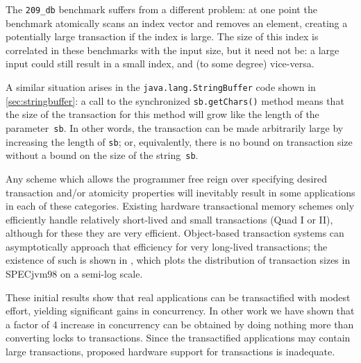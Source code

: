 The \texttt{209\_db} benchmark suffers from a different problem: at one
point the benchmark atomically scans an index vector and removes an
element, creating a potentially large transaction if the index is
large.  The size of this index is correlated in these benchmarks with
the input size, but it need not be: a large input could still result
in a small index, and (to some degree) vice-versa.

A similar situation arises in the {\tt java.lang.StringBuffer} code
shown in \ref{sec:stringbuffer}:  a call to the synchronized
\texttt{sb.getChars()} method means that
the size of the transaction for this method will grow like the length
of the parameter~\texttt{sb}.  In other words, the transaction can be
made arbitrarily large by increasing the length of \texttt{sb}; or,
equivalently, there is no bound on transaction size without a bound on
the size of the string~\texttt{sb}.


Any scheme which allows the programmer free reign over specifying
desired transaction and/or atomicity properties will inevitably result
in some applications in each of these categories.  Existing
hardware transactional memory schemes only efficiently handle
relatively short-lived and small transactions (Quad I or II),
although for these they are very efficient.  Object-based
transaction systems can asymptotically approach that efficiency for
very long-lived transactions;  the existence of such is shown in
, which plots
the distribution of transaction sizes in SPECjvm98
on a semi-log scale.


\vspace*{5mm}

These initial results show that real applications can be
transactified with modest effort, yielding significant gains in
concurrency.  In other work \cite{AnanianAsKuLeLi04} we have shown
that a factor of 4 increase in concurrency can be obtained
by doing nothing more than converting locks to transactions.  Since
the transactified applications may contain large transactions,
proposed hardware support for transactions is inadequate.

